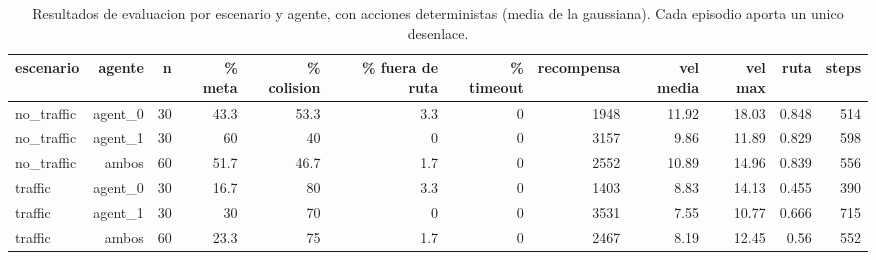 \begin{table}[htbp]
  \centering
  \begin{tabular}{lrrrrrrrrrrr}
    \toprule
    escenario & agente & n & \% meta & \% colision & \% fuera de ruta & \% timeout & recompensa & vel media & vel max & ruta & steps \\
    \midrule
    no\_traffic & agent\_0 & 30 & 43.3 & 53.3 & 3.3 & 0 & 1948 & 11.92 & 18.03 & 0.848 & 514 \\
    no\_traffic & agent\_1 & 30 & 60 & 40 & 0 & 0 & 3157 & 9.86 & 11.89 & 0.829 & 598 \\
    no\_traffic & ambos & 60 & 51.7 & 46.7 & 1.7 & 0 & 2552 & 10.89 & 14.96 & 0.839 & 556 \\
    traffic & agent\_0 & 30 & 16.7 & 80 & 3.3 & 0 & 1403 & 8.83 & 14.13 & 0.455 & 390 \\
    traffic & agent\_1 & 30 & 30 & 70 & 0 & 0 & 3531 & 7.55 & 10.77 & 0.666 & 715 \\
    traffic & ambos & 60 & 23.3 & 75 & 1.7 & 0 & 2467 & 8.19 & 12.45 & 0.56 & 552 \\
    \bottomrule
  \end{tabular}
  \caption{Resultados de evaluacion por escenario y agente, con acciones deterministas (media de la gaussiana). Cada episodio aporta un unico desenlace.}
  \label{tab:eval_principal}
\end{table}
